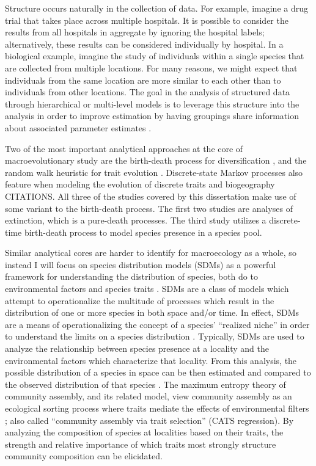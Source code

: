 Structure occurs naturally in the collection of data. For example, imagine a drug trial that takes place across multiple hospitals. It is possible to consider the results from all hospitals in aggregate by ignoring the hospital labels; alternatively, these results can be considered individually by hospital. In a biological example, imagine the study of individuals within a single species that are collected from multiple locations. For many reasons, we might expect that individuals from the same location are more similar to each other than to individuals from other locations. The goal in the analysis of structured data through hierarchical or multi-level models is to leverage this structure into the analysis in order to improve estimation by having groupings share information about associated parameter estimates \citep{Gelman2013d,McElreath2016}. 

Two of the most important analytical approaches at the core of macroevolutionary study are the birth-death process for diversification \citep{Raup1973,Raup1985,Nee1992,Nee1994a,Nee2001,Nee2006b,Stadler2013b}, and the random walk heuristic for trait evolution \citep{Raup1974a,Felsenstein1985b,Bookstein1987b,Gingerich1993,Roopnarine2001a,Roopnarine2003b,Roopnarine1999,Sheets2001,Hunt2006a,Hunt2007a}. Discrete-state Markov processes also feature when modeling the evolution of discrete traits and biogeography CITATIONS. All three of the studies covered by this dissertation make use of some variant to the birth-death process. The first two studies are analyses of extinction, which is a pure-death processes. The third study utilizes a discrete-time birth-death process to model species presence in a species pool.

Similar analytical cores are harder to identify for macroecology as a whole, so instead I will focus on species distribution models (SDMs) as a powerful framework for understanding the distribution of species, both do to environmental factors \citep{Elith2009} and species traits \citep{Shipley2006}. SDMs are a class of models which attempt to operationalize the multitude of processes which result in the distribution of one or more species in both space and/or time. In effect, SDMs are a means of operationalizing the concept of a species' ``realized niche'' in order to understand the limits on a species distribution \citep{Elith2009}. Typically, SDMs are used to analyze the relationship between species presence at a locality and the environmental factors which characterize that locality. From this analysis, the possible distribution of a species in space can be then estimated and compared to the observed distribution of that species \citep{Elith2009,Austin2006,Phillips2006a}. The maximum entropy theory of community assembly, and its related model, view community assembly as an ecological sorting process where traits mediate the effects of environmental filters \citep{Shipley2006,Warton2015a}; also called ``community assembly via trait selection'' (CATS regression). By analyzing the composition of species at localities based on their traits, the strength and relative importance of which traits most strongly structure community composition can be elicidated. 

